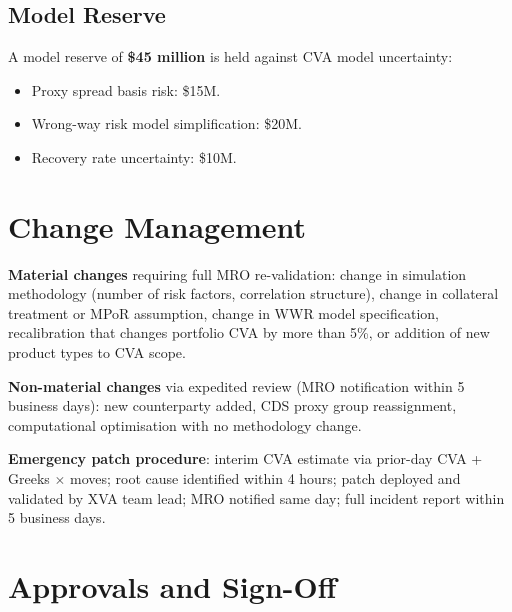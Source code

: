 \documentclass[11pt,a4paper]{article}
\begin{document}
\subsection{Model Reserve}

A model reserve of \textbf{\$45 million} is held against CVA model uncertainty:
\begin{itemize}[noitemsep]
  \item Proxy spread basis risk: \$15M.
  \item Wrong-way risk model simplification: \$20M.
  \item Recovery rate uncertainty: \$10M.
\end{itemize}

\section{Change Management}

\textbf{Material changes} requiring full MRO re-validation: change in
simulation methodology (number of risk factors, correlation structure), change
in collateral treatment or MPoR assumption, change in WWR model specification,
recalibration that changes portfolio CVA by more than 5\%, or addition of new
product types to CVA scope.

\textbf{Non-material changes} via expedited review (MRO notification within
5 business days): new counterparty added, CDS proxy group reassignment,
computational optimisation with no methodology change.

\textbf{Emergency patch procedure}: interim CVA estimate via prior-day CVA +
Greeks $\times$ moves; root cause identified within 4 hours; patch deployed
and validated by XVA team lead; MRO notified same day; full incident report
within 5 business days.

\section{Approvals and Sign-Off}
\end{document}
